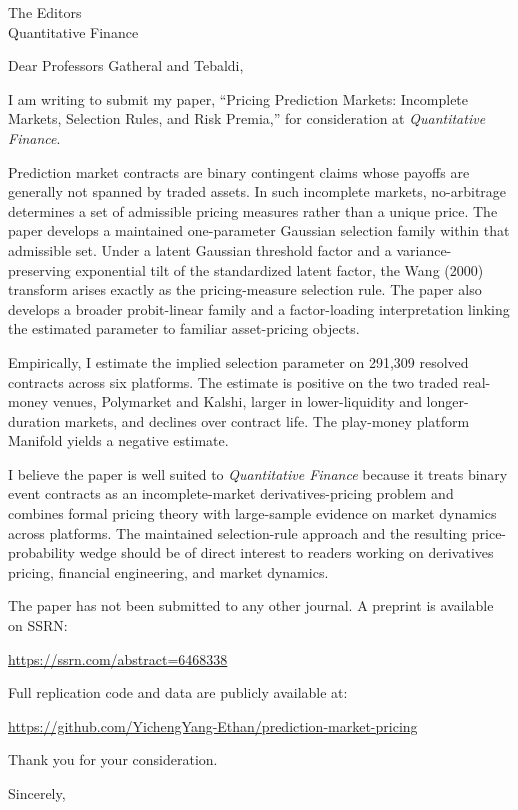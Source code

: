\documentclass[12pt]{letter}
\begin{document}
\begin{letter}{The Editors\\Quantitative Finance}

\opening{Dear Professors Gatheral and Tebaldi,}

I am writing to submit my paper, ``Pricing Prediction Markets: Incomplete Markets, Selection Rules, and Risk Premia,'' for consideration at \textit{Quantitative Finance}.

Prediction market contracts are binary contingent claims whose payoffs are generally not spanned by traded assets. In such incomplete markets, no-arbitrage determines a set of admissible pricing measures rather than a unique price. The paper develops a maintained one-parameter Gaussian selection family within that admissible set. Under a latent Gaussian threshold factor and a variance-preserving exponential tilt of the standardized latent factor, the Wang (2000) transform arises exactly as the pricing-measure selection rule. The paper also develops a broader probit-linear family and a factor-loading interpretation linking the estimated parameter to familiar asset-pricing objects.

Empirically, I estimate the implied selection parameter on 291,309 resolved contracts across six platforms. The estimate is positive on the two traded real-money venues, Polymarket and Kalshi, larger in lower-liquidity and longer-duration markets, and declines over contract life. The play-money platform Manifold yields a negative estimate.

I believe the paper is well suited to \textit{Quantitative Finance} because it treats binary event contracts as an incomplete-market derivatives-pricing problem and combines formal pricing theory with large-sample evidence on market dynamics across platforms. The maintained selection-rule approach and the resulting price-probability wedge should be of direct interest to readers working on derivatives pricing, financial engineering, and market dynamics.

The paper has not been submitted to any other journal. A preprint is available on SSRN:

\url{https://ssrn.com/abstract=6468338}

\noindent Full replication code and data are publicly available at:

\url{https://github.com/YichengYang-Ethan/prediction-market-pricing}

Thank you for your consideration.

\closing{Sincerely,}

\end{letter}
\end{document}
